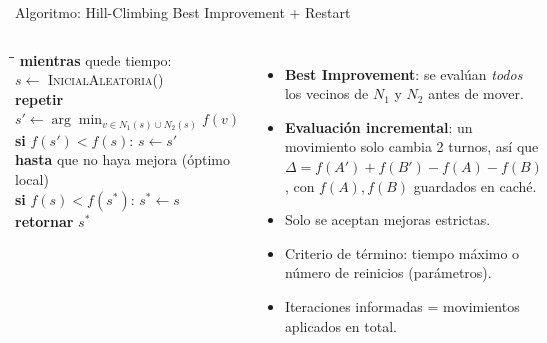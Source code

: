 \documentclass[aspectratio=169,10pt]{beamer}
\begin{document}
\begin{frame}{Algoritmo: Hill-Climbing Best Improvement + Restart}
\begin{columns}[T]
\begin{tabbing}
\quad\=\quad\=\quad\=\kill
\textbf{mientras} quede tiempo:\\
\> $s \leftarrow$ \textsc{InicialAleatoria}()\\
\> \textbf{repetir}\\
\>\> $s' \leftarrow \arg\min_{v\in N_1(s)\cup N_2(s)} f(v)$\\
\>\> \textbf{si} $f(s') < f(s)$: $s\leftarrow s'$\\
\> \textbf{hasta} que no haya mejora (óptimo local)\\
\> \textbf{si} $f(s)<f(s^*)$: $s^*\leftarrow s$\\
\textbf{retornar} $s^*$
\end{tabbing}
\begin{itemize}
\item \textbf{Best Improvement}: se evalúan \emph{todos} los vecinos de $N_1$ y $N_2$ antes de mover.
\item \textbf{Evaluación incremental}: un movimiento solo cambia 2 turnos, así que\\
$\Delta=f(A')+f(B')-f(A)-f(B)$, con $f(A),f(B)$ guardados en caché.
\item Solo se aceptan mejoras estrictas.
\item Criterio de término: tiempo máximo o número de reinicios (parámetros).
\item Iteraciones informadas = movimientos aplicados en total.
\end{itemize}
\end{columns}
\end{frame}
\end{document}
